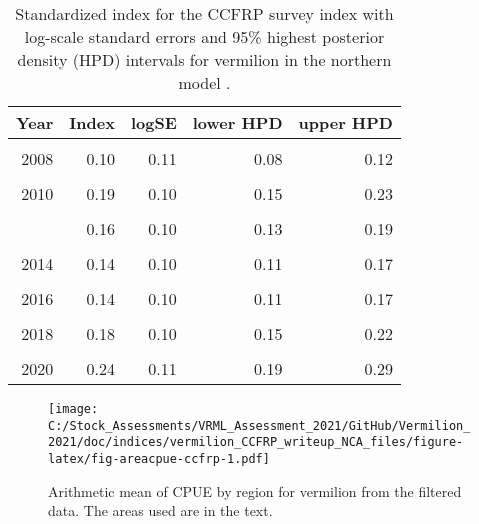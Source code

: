 \documentclass[
]{article}
\begin{document}
\begin{table}

\caption{\label{tab:tab-index-ccfrp}Standardized index for the CCFRP survey index with log-scale standard errors and 95\% highest
       posterior density (HPD) intervals for vermilion in the northern model .}
\centering
\begin{tabular}[t]{rrrrr}
\toprule
Year & Index & logSE & lower HPD & upper HPD\\
\midrule
\cellcolor{gray!6}{2007} & \cellcolor{gray!6}{0.11} & \cellcolor{gray!6}{0.13} & \cellcolor{gray!6}{0.09} & \cellcolor{gray!6}{0.14}\\
2008 & 0.10 & 0.11 & 0.08 & 0.12\\
\cellcolor{gray!6}{2009} & \cellcolor{gray!6}{0.16} & \cellcolor{gray!6}{0.11} & \cellcolor{gray!6}{0.13} & \cellcolor{gray!6}{0.19}\\
2010 & 0.19 & 0.10 & 0.15 & 0.23\\
\cellcolor{gray!6}{2011} & \cellcolor{gray!6}{0.16} & \cellcolor{gray!6}{0.10} & \cellcolor{gray!6}{0.13} & \cellcolor{gray!6}{0.19}\\
\addlinespace
2012 & 0.16 & 0.10 & 0.13 & 0.19\\
\cellcolor{gray!6}{2013} & \cellcolor{gray!6}{0.08} & \cellcolor{gray!6}{0.12} & \cellcolor{gray!6}{0.06} & \cellcolor{gray!6}{0.10}\\
2014 & 0.14 & 0.10 & 0.11 & 0.17\\
\cellcolor{gray!6}{2015} & \cellcolor{gray!6}{0.19} & \cellcolor{gray!6}{0.13} & \cellcolor{gray!6}{0.14} & \cellcolor{gray!6}{0.24}\\
2016 & 0.14 & 0.10 & 0.11 & 0.17\\
\addlinespace
\cellcolor{gray!6}{2017} & \cellcolor{gray!6}{0.14} & \cellcolor{gray!6}{0.10} & \cellcolor{gray!6}{0.11} & \cellcolor{gray!6}{0.17}\\
2018 & 0.18 & 0.10 & 0.15 & 0.22\\
\cellcolor{gray!6}{2019} & \cellcolor{gray!6}{0.22} & \cellcolor{gray!6}{0.10} & \cellcolor{gray!6}{0.18} & \cellcolor{gray!6}{0.26}\\
2020 & 0.24 & 0.11 & 0.19 & 0.29\\
\bottomrule
\end{tabular}
\end{table}

\FloatBarrier

\begin{figure}
\centering
\texttt{[image: C:/Stock\_Assessments/VRML\_Assessment\_2021/GitHub/Vermilion\_2021/doc/indices/vermilion\_CCFRP\_writeup\_NCA\_files/figure-latex/fig-areacpue-ccfrp-1.pdf]}
\caption{\label{fig:fig-areacpue-ccfrp}Arithmetic mean of CPUE by region for vermilion from the filtered data. The areas used are in the text.}
\end{figure}
\end{document}
